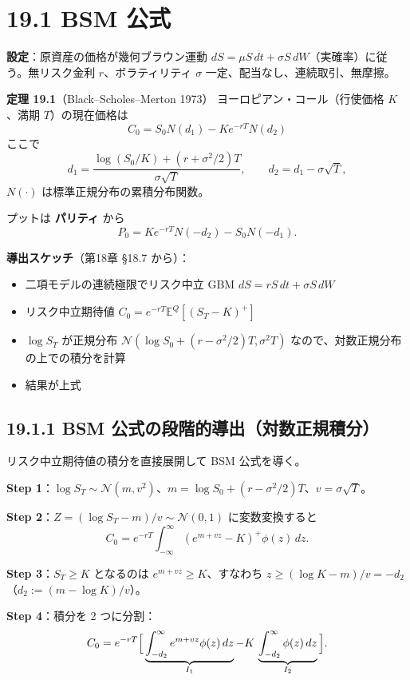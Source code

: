\documentclass[11pt,a4paper]{report}
\begin{document}
\section{19.1 BSM 公式}

\textbf{設定}：原資産の価格が幾何ブラウン運動 $dS = \mu S\, dt + \sigma S\, dW$（実確率）に従う。無リスク金利 $r$、ボラティリティ $\sigma$ 一定、配当なし、連続取引、無摩擦。

\textbf{定理 19.1}（Black–Scholes–Merton 1973） ヨーロピアン・コール（行使価格 $K$、満期 $T$）の現在価格は \[ \boxed{\; C_0 = S_0 N(d_1) - K e^{-rT} N(d_2) \;} \] ここで \[ d_1 = \frac{\log(S_0 / K) + (r + \sigma^2 / 2) T}{\sigma \sqrt{T}}, \qquad d_2 = d_1 - \sigma \sqrt{T}, \] $N(\cdot)$ は標準正規分布の累積分布関数。

プットは \textbf{パリティ} から \[ P_0 = K e^{-rT} N(-d_2) - S_0 N(-d_1). \]

\textbf{導出スケッチ}（第18章 §18.7 から）：
\begin{itemize}
\item 二項モデルの連続極限でリスク中立 GBM $dS = r S\, dt + \sigma S\, dW$
\item リスク中立期待値 $C_0 = e^{-rT} \mathbb{E}^Q[(S_T - K)^+]$
\item $\log S_T$ が正規分布 $\mathcal{N}(\log S_0 + (r - \sigma^2/2)T, \sigma^2 T)$ なので、対数正規分布の上での積分を計算
\item 結果が上式
\end{itemize}

\subsection{19.1.1 BSM 公式の段階的導出（対数正規積分）}

リスク中立期待値の積分を直接展開して BSM 公式を導く。

\textbf{Step 1}：$\log S_T \sim \mathcal{N}(m, v^2)$、$m = \log S_0 + (r - \sigma^2/2)T$、$v = \sigma\sqrt{T}$。

\textbf{Step 2}：$Z = (\log S_T - m)/v \sim \mathcal{N}(0, 1)$ に変数変換すると \[ C_0 = e^{-rT} \int_{-\infty}^\infty (e^{m + v z} - K)^+ \phi(z)\, dz. \]

\textbf{Step 3}：$S_T \ge K$ となるのは $e^{m + v z} \ge K$、すなわち $z \ge (\log K - m)/v = -d_2$（$d_2 := (m - \log K)/v$）。

\textbf{Step 4}：積分を 2 つに分割： \[ C_0 = e^{-rT}\Bigl[\,\underbrace{\int_{-d_2}^\infty e^{m + v z} \phi(z)\, dz}_{I_1} - K\, \underbrace{\int_{-d_2}^\infty \phi(z)\, dz}_{I_2}\,\Bigr]. \]
\end{document}
